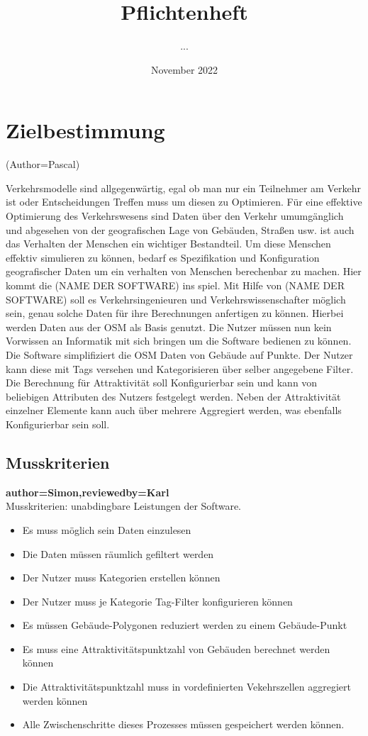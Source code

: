 \documentclass[parskip=full]{scrartcl} %
\title{Pflichtenheft}
\author{...}
\date{November 2022}
\begin{document}
\maketitle
\newpage

\tableofcontents
\newpage




\section{Zielbestimmung}

(Author=Pascal)

Verkehrsmodelle sind allgegenwärtig, egal ob man nur ein Teilnehmer am Verkehr ist oder Entscheidungen Treffen muss um diesen zu Optimieren.
Für eine effektive Optimierung des Verkehrswesens sind Daten über den Verkehr umumgänglich und abgesehen von der geografischen Lage von Gebäuden, Straßen usw. ist auch das Verhalten der Menschen ein wichtiger Bestandteil.
Um diese Menschen effektiv simulieren zu können, bedarf es Spezifikation und Konfiguration geografischer Daten um ein verhalten von Menschen berechenbar zu machen.
Hier kommt die (NAME DER SOFTWARE) ins spiel.
Mit Hilfe von (NAME DER SOFTWARE) soll es  Verkehrsingenieuren und Verkehrswissenschafter möglich sein, genau solche Daten für ihre Berechnungen anfertigen zu können.
Hierbei werden Daten aus der OSM als Basis genutzt.
Die Nutzer müssen nun kein Vorwissen an Informatik mit sich bringen um die Software bedienen zu können.
Die Software simplifiziert die OSM Daten von Gebäude auf Punkte. Der Nutzer kann diese mit Tags versehen und Kategorisieren über selber angegebene Filter.
Die Berechnung für Attraktivität soll Konfigurierbar sein und kann von beliebigen Attributen des Nutzers festgelegt werden.
Neben der Attraktivität einzelner Elemente kann auch über mehrere Aggregiert werden, was ebenfalls Konfigurierbar sein soll.

\subsection{Musskriterien}
\textbf{author=Simon,reviewedby=Karl\\}
Musskriterien: unabdingbare Leistungen der Software.
\begin{itemize}
    \item Es muss möglich sein Daten einzulesen
    \item Die Daten müssen räumlich gefiltert werden
    \item Der Nutzer muss Kategorien erstellen können
    \item Der Nutzer muss je Kategorie Tag-Filter konfigurieren können
    \item Es müssen Gebäude-Polygonen reduziert werden zu einem Gebäude-Punkt
    \item Es muss eine Attraktivitätspunktzahl von Gebäuden berechnet werden können
    \item Die Attraktivitätspunktzahl muss in vordefinierten Vekehrszellen aggregiert werden können 
    \item Alle Zwischenschritte dieses Prozesses müssen gespeichert werden können.
\end{itemize}
\end{document}
